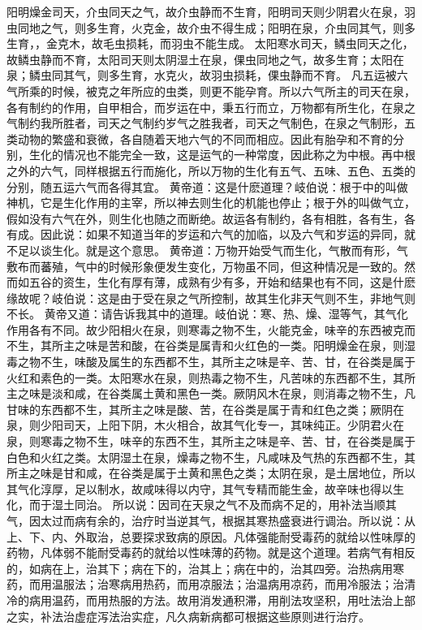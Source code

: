 \documentclass[a4paper,12pt,UTF8,twoside]{ctexbook}
\begin{document}
阳明燥金司天，介虫同天之气，故介虫静而不生育，阳明司天则少阴君火在泉，羽虫同地之气，则多生育，火克金，故介虫不得生成；阳明在泉，介虫同其气，则多生育，，金克木，故毛虫损耗，而羽虫不能生成。
太阳寒水司天，鳞虫同天之化，故鳞虫静而不育，太阳司天则太阴湿土在泉，倮虫同地之气，故多生育；太阳在泉；鳞虫同其气，则多生育，水克火，故羽虫损耗，倮虫静而不育。
凡五运被六气所乘的时候，被克之年所应的虫类，则更不能孕育。所以六气所主的司天在泉，各有制约的作用，自甲相合，而岁运在中，秉五行而立，万物都有所生化，在泉之气制约我所胜者，司天之气制约岁气之胜我者，司天之气制色，在泉之气制形，五类动物的繁盛和衰微，各自随着天地六气的不同而相应。因此有胎孕和不育的分别，生化的情况也不能完全一致，这是运气的一种常度，因此称之为中根。再中根之外的六气，同样根据五行而施化，所以万物的生化有五气、五味、五色、五类的分别，随五运六气而各得其宜。
黄帝道：这是什麽道理？岐伯说：根于中的叫做神机，它是生化作用的主宰，所以神去则生化的机能也停止；根于外的叫做气立，假如没有六气在外，则生化也随之而断绝。故运各有制约，各有相胜，各有生，各有成。因此说：如果不知道当年的岁运和六气的加临，以及六气和岁运的异同，就不足以谈生化。就是这个意思。
黄帝道：万物开始受气而生化，气散而有形，气敷布而蕃殖，气中的时候形象便发生变化，万物虽不同，但这种情况是一致的。然而如五谷的资生，生化有厚有薄，成熟有少有多，开始和结果也有不同，这是什麽缘故呢？岐伯说：这是由于受在泉之气所控制，故其生化非天气则不生，非地气则不长。
黄帝又道：请告诉我其中的道理。岐伯说：寒、热、燥、湿等气，其气化作用各有不同。故少阳相火在泉，则寒毒之物不生，火能克金，味辛的东西被克而不生，其所主之味是苦和酸，在谷类是属青和火红色的一类。阳明燥金在泉，则湿毒之物不生，味酸及属生的东西都不生，其所主之味是辛、苦、甘，在谷类是属于火红和素色的一类。太阳寒水在泉，则热毒之物不生，凡苦味的东西都不生，其所主之味是淡和咸，在谷类属土黄和黑色一类。厥阴风木在泉，则消毒之物不生，凡甘味的东西都不生，其所主之味是酸、苦，在谷类是属于青和红色之类；厥阴在泉，则少阳司天，上阳下阴，木火相合，故其气化专一，其味纯正。少阴君火在泉，则寒毒之物不生，味辛的东西不生，其所主之味是辛、苦、甘，在谷类是属于白色和火红之类。太阴湿土在泉，燥毒之物不生，凡咸味及气热的东西都不生，其所主之味是甘和咸，在谷类是属于土黄和黑色之类；太阴在泉，是土居地位，所以其气化淳厚，足以制水，故咸味得以内守，其气专精而能生金，故辛味也得以生化，而于湿土同治。
所以说：因司在天泉之气不及而病不足的，用补法当顺其气，因太过而病有余的，治疗时当逆其气，根据其寒热盛衰进行调治。所以说：从上、下、内、外取治，总要探求致病的原因。凡体强能耐受毒药的就给以性味厚的药物，凡体弱不能耐受毒药的就给以性味薄的药物。就是这个道理。若病气有相反的，如病在上，治其下；病在下的，治其上；病在中的，治其四旁。治热病用寒药，而用温服法；治寒病用热药，而用凉服法；治温病用凉药，而用冷服法；治清冷的病用温药，而用热服的方法。故用消发通积滞，用削法攻坚积，用吐法治上部之实，补法治虚症泻法治实症，凡久病新病都可根据这些原则进行治疗。
\end{document}
